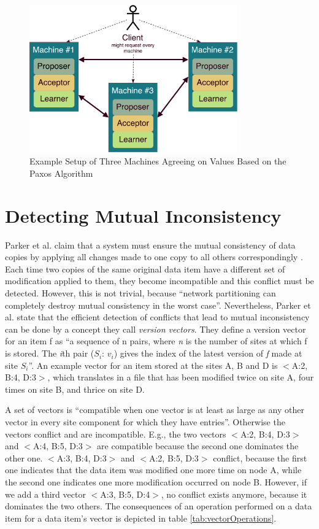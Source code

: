 \begin{figure}[ht]
    \centering
	\includegraphics[width=0.8\textwidth]{fig/PaxosSetup.pdf}
	\caption{Example Setup of Three Machines Agreeing on Values Based on the Paxos Algorithm}
	\label{fig:paxosSetup}
\end{figure}

\section{Detecting Mutual Inconsistency}
\label{sec:versionVector}

Parker et al. claim that a system must ensure the mutual consistency of data copies by applying all changes made to one copy to all others correspondingly \cite{versionVektor}. Each time two copies of the same original data item have a different set of modification applied to them, they become incompatible and this conflict must be detected. However, this is not trivial, because \enquote{network partitioning can completely destroy mutual consistency in the worst case}. Nevertheless, Parker et al. state that the efficient detection of conflicts that lead to mutual inconsistency can be done by a concept they call \textit{version vectors}. They define a version vector for an item f as \enquote{a sequence of n pairs, where \textit{n} is the number of sites at which f is stored. The \textit{i}th pair ($S_i$: $v_i$) gives the index of the latest version of \textit{f} made at site $S_i$}. An example vector for an item stored at the sites A, B and D is $<$A:2, B:4, D:3$>$, which translates in a file that has been modified twice on site A, four times on site B, and thrice on site D.

A set of vectors is \enquote{compatible when one vector is at least as large as any other vector in every site component for which they have entries}. Otherwise the vectors conflict and are incompatible. E.g., the two vectors $<$A:2, B:4, D:3$>$ and $<$A:4, B:5, D:3$>$ are compatible because the second one dominates the other one. $<$A:3, B:4, D:3$>$ and $<$A:2, B:5, D:3$>$ conflict, because the first one indicates that the data item was modified one more time on node A, while the second one indicates one more modification occurred on node B. However, if we add a third vector $<$A:3, B:5, D:4$>$, no conflict exists anymore, because it dominates the two others. The consequences of an operation performed on a data item for a data item's vector is depicted in table \ref{tab:vectorOperations}.

